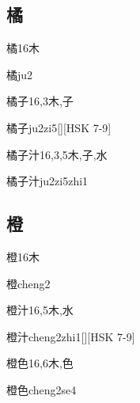 \subsection*{橘}

\begin{Entry}{橘}{16}{⽊}
  \begin{Phonetics}{橘}{ju2}
  \end{Phonetics}
\end{Entry}

\begin{Entry}{橘子}{16,3}{⽊,⼦}
  \begin{Phonetics}{橘子}{ju2zi5}[][HSK 7-9]
  \end{Phonetics}
\end{Entry}

\begin{Entry}{橘子汁}{16,3,5}{⽊,⼦,⽔}
  \begin{Phonetics}{橘子汁}{ju2zi5zhi1}
  \end{Phonetics}
\end{Entry}

\subsection*{橙}

\begin{Entry}{橙}{16}{⽊}
  \begin{Phonetics}{橙}{cheng2}
  \end{Phonetics}
\end{Entry}

\begin{Entry}{橙汁}{16,5}{⽊,⽔}
  \begin{Phonetics}{橙汁}{cheng2zhi1}[][HSK 7-9]
  \end{Phonetics}
\end{Entry}

\begin{Entry}{橙色}{16,6}{⽊,⾊}
  \begin{Phonetics}{橙色}{cheng2se4}
  \end{Phonetics}
\end{Entry}

